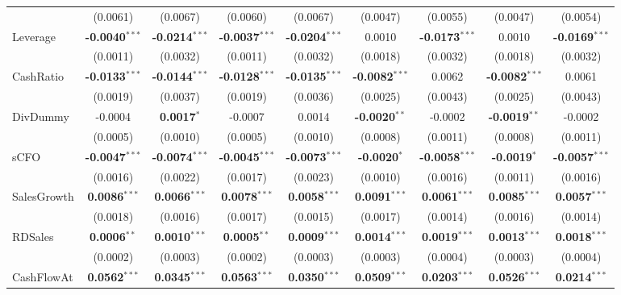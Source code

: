 \documentclass[11pt,a4paper]{article}
\begin{document}
\begin{table}[htbp]
\begin{tabular}{lcccccccc}
 & (0.0061) & (0.0067) & (0.0060) & (0.0067) & (0.0047) & (0.0055) & (0.0047) & (0.0054) \\
Leverage & \textbf{-0.0040}$^{***}$ & \textbf{-0.0214}$^{***}$ & \textbf{-0.0037}$^{***}$ & \textbf{-0.0204}$^{***}$ & 0.0010 & \textbf{-0.0173}$^{***}$ & 0.0010 & \textbf{-0.0169}$^{***}$ \\
 & (0.0011) & (0.0032) & (0.0011) & (0.0032) & (0.0018) & (0.0032) & (0.0018) & (0.0032) \\
CashRatio & \textbf{-0.0133}$^{***}$ & \textbf{-0.0144}$^{***}$ & \textbf{-0.0128}$^{***}$ & \textbf{-0.0135}$^{***}$ & \textbf{-0.0082}$^{***}$ & 0.0062 & \textbf{-0.0082}$^{***}$ & 0.0061 \\
 & (0.0019) & (0.0037) & (0.0019) & (0.0036) & (0.0025) & (0.0043) & (0.0025) & (0.0043) \\
DivDummy & -0.0004 & \textbf{0.0017}$^{*}$ & -0.0007 & 0.0014 & \textbf{-0.0020}$^{**}$ & -0.0002 & \textbf{-0.0019}$^{**}$ & -0.0002 \\
 & (0.0005) & (0.0010) & (0.0005) & (0.0010) & (0.0008) & (0.0011) & (0.0008) & (0.0011) \\
sCFO & \textbf{-0.0047}$^{***}$ & \textbf{-0.0074}$^{***}$ & \textbf{-0.0045}$^{***}$ & \textbf{-0.0073}$^{***}$ & \textbf{-0.0020}$^{*}$ & \textbf{-0.0058}$^{***}$ & \textbf{-0.0019}$^{*}$ & \textbf{-0.0057}$^{***}$ \\
 & (0.0016) & (0.0022) & (0.0017) & (0.0023) & (0.0010) & (0.0016) & (0.0011) & (0.0016) \\
SalesGrowth & \textbf{0.0086}$^{***}$ & \textbf{0.0066}$^{***}$ & \textbf{0.0078}$^{***}$ & \textbf{0.0058}$^{***}$ & \textbf{0.0091}$^{***}$ & \textbf{0.0061}$^{***}$ & \textbf{0.0085}$^{***}$ & \textbf{0.0057}$^{***}$ \\
 & (0.0018) & (0.0016) & (0.0017) & (0.0015) & (0.0017) & (0.0014) & (0.0016) & (0.0014) \\
RDSales & \textbf{0.0006}$^{**}$ & \textbf{0.0010}$^{***}$ & \textbf{0.0005}$^{**}$ & \textbf{0.0009}$^{***}$ & \textbf{0.0014}$^{***}$ & \textbf{0.0019}$^{***}$ & \textbf{0.0013}$^{***}$ & \textbf{0.0018}$^{***}$ \\
 & (0.0002) & (0.0003) & (0.0002) & (0.0003) & (0.0003) & (0.0004) & (0.0003) & (0.0004) \\
CashFlowAt & \textbf{0.0562}$^{***}$ & \textbf{0.0345}$^{***}$ & \textbf{0.0563}$^{***}$ & \textbf{0.0350}$^{***}$ & \textbf{0.0509}$^{***}$ & \textbf{0.0203}$^{***}$ & \textbf{0.0526}$^{***}$ & \textbf{0.0214}$^{***}$ \\

\end{tabular}
\end{table}
\end{document}
